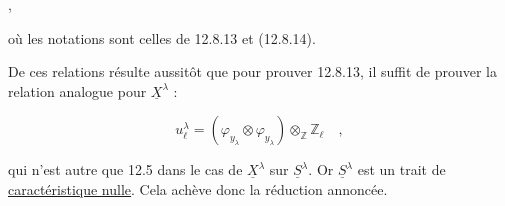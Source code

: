 \begin{center}
 \qquad ,
\end{center}
où les notations sont celles de 12.8.13 et (12.8.14).

De ces relations résulte aussitôt que pour prouver 12.8.13, il suffit de prouver la relation analogue pour $\underline{X}^{\lambda}$ :

\begin{equation*}
u^{\lambda}_{\ell} = (\varphi_{y_{\lambda}} \otimes \varphi_{y_{\lambda}}) \otimes_{\mathbb{Z}} \mathbb{Z}_{\ell} \quad ,
\end{equation*}


qui n'est autre que 12.5 dans le cas de $\underline{X}^{\lambda}$ sur $\underline{S}^{\lambda}$. Or $\underline{S}^\lambda$ est un trait de \underline{caractéristique nulle}. Cela achève donc la réduction annoncée.

